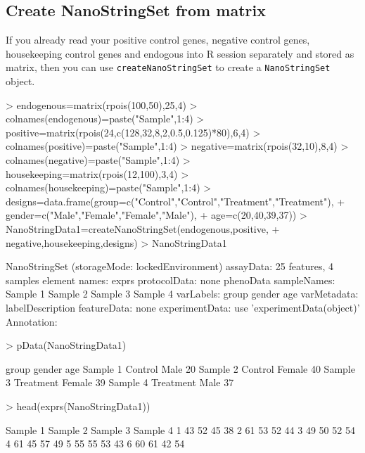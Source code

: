 \documentclass[12pt]{article}
\begin{document}
\subsection{Create NanoStringSet from matrix}
If you already read your positive control genes, negative control genes, 
housekeeping control genes and endogous into R session separately and 
stored as matrix, then you can use {\tt createNanoStringSet} to create a 
{\tt NanoStringSet} object.


\begin{Schunk}
\begin{Sinput}
> endogenous=matrix(rpois(100,50),25,4)
> colnames(endogenous)=paste("Sample",1:4)
> positive=matrix(rpois(24,c(128,32,8,2,0.5,0.125)*80),6,4)
> colnames(positive)=paste("Sample",1:4)
> negative=matrix(rpois(32,10),8,4)
> colnames(negative)=paste("Sample",1:4)
> housekeeping=matrix(rpois(12,100),3,4)
> colnames(housekeeping)=paste("Sample",1:4)
> designs=data.frame(group=c("Control","Control","Treatment","Treatment"),
+                    gender=c("Male","Female","Female","Male"),
+                    age=c(20,40,39,37))
> NanoStringData1=createNanoStringSet(endogenous,positive,
+                                  negative,housekeeping,designs)
> NanoStringData1
\end{Sinput}
\begin{Soutput}
NanoStringSet (storageMode: lockedEnvironment)
assayData: 25 features, 4 samples 
  element names: exprs 
protocolData: none
phenoData
  sampleNames: Sample 1 Sample 2 Sample 3 Sample 4
  varLabels: group gender age
  varMetadata: labelDescription
featureData: none
experimentData: use 'experimentData(object)'
Annotation:  
\end{Soutput}
\begin{Sinput}
> pData(NanoStringData1)
\end{Sinput}
\begin{Soutput}
             group gender age
Sample 1   Control   Male  20
Sample 2   Control Female  40
Sample 3 Treatment Female  39
Sample 4 Treatment   Male  37
\end{Soutput}
\begin{Sinput}
> head(exprs(NanoStringData1))
\end{Sinput}
\begin{Soutput}
  Sample 1 Sample 2 Sample 3 Sample 4
1       43       52       45       38
2       61       53       52       44
3       49       50       52       54
4       61       45       57       49
5       55       55       53       43
6       60       61       42       54
\end{Soutput}
\end{Schunk}
\end{document}
